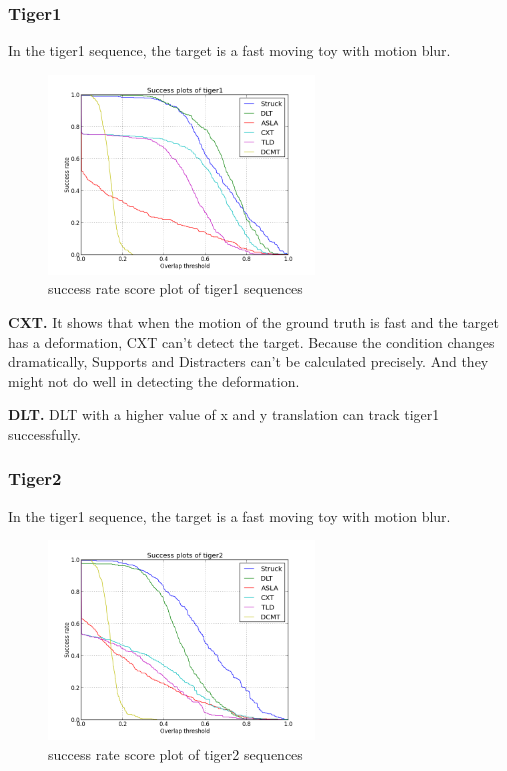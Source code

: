 \documentclass{acm_proc_article-sp}
\begin{document}
\subsubsection{Tiger1}

In the tiger1 sequence, the target is a fast moving toy with motion blur.

\begin{figure}[hbt]
	\centering
    \includegraphics[width=200pt]{tiger1}
    \caption{success rate score plot of tiger1 sequences}
    \label{fig:tiger1}
\end{figure}

\textbf{CXT.} It shows that when the motion of the ground truth is fast and the target has a deformation, CXT can't detect the target. Because the condition changes dramatically, Supports and Distracters can't be calculated precisely. And they might not do well in detecting the deformation.

\textbf{DLT.} DLT with a higher value of x and y translation can track tiger1 successfully.

\subsubsection{Tiger2}

In the tiger1 sequence, the target is a fast moving toy with motion blur.

\begin{figure}[hbt]
	\centering
    \includegraphics[width=200pt]{tiger2}
    \caption{success rate score plot of tiger2 sequences}
    \label{fig:tiger2}
\end{figure}
\end{document}
